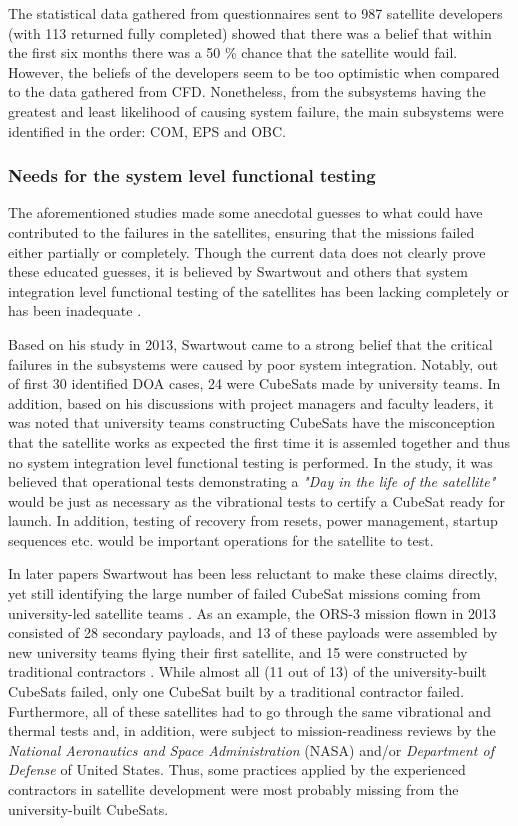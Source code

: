 \documentclass[english,12pt,a4paper,pdftex,elec,utf8]{aaltothesis}
\begin{document}
The statistical data gathered from questionnaires sent to 987 satellite developers (with 113 returned fully completed) showed that there was a belief that within the first six months there was a 50 \% chance that the satellite would fail. However, the beliefs of the developers seem to be too optimistic when compared to the data gathered from CFD. Nonetheless, from the subsystems having the greatest and least likelihood of causing system failure, the main subsystems were identified in the order: COM, EPS and OBC. \cite{Langer}\par
\subsubsection{Needs for the system level functional testing}
The aforementioned studies made some anecdotal guesses to what could have contributed to the failures in the satellites, ensuring that the missions failed either partially or completely. Though the current data does not clearly prove these educated guesses, it is believed by Swartwout and others that system integration level functional testing of the satellites has been lacking completely or has been inadequate \cite{Swart2016, Langer, Swart1, Swart2015}. \par
Based on his study in 2013, Swartwout came to a strong belief that the critical failures in the subsystems were caused by poor system integration. Notably, out of first 30 identified DOA cases, 24 were CubeSats made by university teams. In addition, based on his discussions with project managers and faculty leaders, it was noted that university teams constructing CubeSats have the misconception that the satellite works as expected the first time it is assemled together and thus no system integration level functional testing is performed. In the study, it was believed that operational tests demonstrating a \textit{"Day in the life of the satellite"} would be just as necessary as the vibrational tests to certify a CubeSat ready for launch. In addition, testing of recovery from resets, power management, startup sequences etc. would be important operations for the satellite to test. \cite{Swart1} \par
In later papers Swartwout has been less reluctant to make these claims directly, yet still identifying the large number of failed CubeSat missions coming from university-led satellite teams \cite{Swart2016, Swart2015}. As an example, the ORS-3 mission flown in 2013 consisted of 28 secondary payloads, and 13 of these payloads were assembled by new university teams flying their first satellite, and 15 were constructed by traditional contractors \cite{Swart2016}. While almost all (11 out of 13) of the university-built CubeSats failed, only one CubeSat built by a traditional contractor failed. Furthermore, all of these satellites had to go through the same vibrational and thermal tests and, in addition, were subject to mission-readiness reviews by the \textit{National Aeronautics and Space Administration} (NASA) and/or \textit{Department of Defense} of United States. Thus, some practices applied by the experienced contractors in satellite development were most probably missing from the university-built CubeSats.\par
\end{document}

